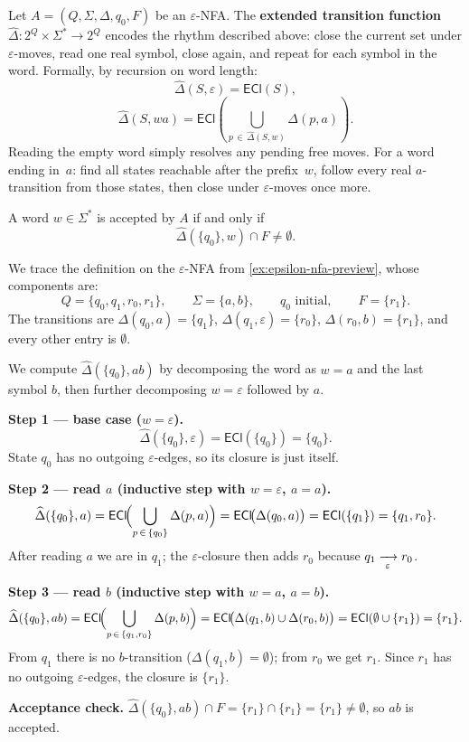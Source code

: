 \begin{definition}
\label{def:epsilon-nfa-hat-delta}
Let $A=(Q,\Sigma,\Delta,q_0,F)$ be an $\varepsilon$-NFA.  The
\textbf{extended transition function}
$\widehat{\Delta}:2^Q\times\Sigma^*\to 2^Q$ encodes the rhythm
described above: close the current set under $\varepsilon$-moves, read
one real symbol, close again, and repeat for each symbol in the word.
Formally, by recursion on word length:
\[
  \widehat{\Delta}(S,\varepsilon)=\mathsf{ECl}(S),
\]
\[
  \widehat{\Delta}(S,wa)=
    \mathsf{ECl}\!\left(
      \bigcup_{p\,\in\,\widehat{\Delta}(S,w)}\Delta(p,a)
    \right).
\]
Reading the empty word simply resolves any pending free moves.  For a
word ending in~$a$: find all states reachable after the prefix~$w$,
follow every real $a$-transition from those states, then close under
$\varepsilon$-moves once more.

A word $w\in\Sigma^*$ is accepted by $A$ if and only if
\[
  \widehat{\Delta}(\{q_0\},w)\cap F\neq\emptyset.
\]
\end{definition}

\begin{example}
\label{ex:hat-delta-trace}
We trace the definition on the $\varepsilon$-NFA from
\cref{ex:epsilon-nfa-preview}, whose components are:
\[
  Q=\{q_0,q_1,r_0,r_1\},\qquad
  \Sigma=\{a,b\},\qquad
  q_0\text{ initial},\qquad
  F=\{r_1\}.
\]
The transitions are
$\Delta(q_0,a)=\{q_1\}$,
$\Delta(q_1,\varepsilon)=\{r_0\}$,
$\Delta(r_0,b)=\{r_1\}$,
and every other entry is $\emptyset$.

\medskip\noindent
We compute $\widehat{\Delta}(\{q_0\},ab)$ by decomposing the word
as $w=a$ and the last symbol $b$, then further decomposing $w=\varepsilon$
followed by $a$.

\medskip\noindent
\textbf{Step 1 --- base case ($w=\varepsilon$).}
\[
  \widehat{\Delta}(\{q_0\},\varepsilon)
  =\mathsf{ECl}(\{q_0\})
  =\{q_0\}.
\]
State $q_0$ has no outgoing $\varepsilon$-edges, so its closure is
just itself.

\medskip\noindent
\textbf{Step 2 --- read $a$ (inductive step with $w=\varepsilon$,
$a=a$).}
\[
  \widehat{\Delta}(\{q_0\},a)
  =\mathsf{ECl}\!\Bigl(
      \bigcup_{p\,\in\,\{q_0\}}\Delta(p,a)
   \Bigr)
  =\mathsf{ECl}\!\bigl(\Delta(q_0,a)\bigr)
  =\mathsf{ECl}(\{q_1\})
  =\{q_1,r_0\}.
\]
After reading $a$ we are in $q_1$; the $\varepsilon$-closure then adds
$r_0$ because $q_1\xrightarrow[{\;\varepsilon\;}]{}r_0$.

\medskip\noindent
\textbf{Step 3 --- read $b$ (inductive step with $w=a$, $a=b$).}
\[
  \widehat{\Delta}(\{q_0\},ab)
  =\mathsf{ECl}\!\Bigl(
      \bigcup_{p\,\in\,\{q_1,r_0\}}\Delta(p,b)
   \Bigr)
  =\mathsf{ECl}\!\bigl(\Delta(q_1,b)\cup\Delta(r_0,b)\bigr)
  =\mathsf{ECl}(\emptyset\cup\{r_1\})
  =\{r_1\}.
\]
From $q_1$ there is no $b$-transition ($\Delta(q_1,b)=\emptyset$);
from $r_0$ we get $r_1$.  Since $r_1$ has no outgoing
$\varepsilon$-edges, the closure is $\{r_1\}$.

\medskip\noindent
\textbf{Acceptance check.}
$\widehat{\Delta}(\{q_0\},ab)\cap F
=\{r_1\}\cap\{r_1\}=\{r_1\}\neq\emptyset$,
so $ab$ is accepted.
\end{example}

